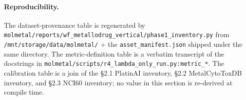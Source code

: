 
\paragraph{Reproducibility.}
The dataset-provenance table is regenerated by
\texttt{molmetal/reports/wf\_metallodrug\_vertical/phase1\_inventory.py}
from \texttt{/mnt/storage/data/molmetal/} + the
\texttt{asset\_manifest.json} shipped under the same directory.  The
metric-definition table is a verbatim transcript of the docstrings in
\texttt{molmetal/scripts/r4\_lambda\_only\_run.py:metric\_*}.  The
calibration table is a join of the §2.1 PlatinAI inventory, §2.2
MetalCytoToxDB inventory, and §2.3 NCI60 inventory; no value in this
section is re-derived at compile time.
